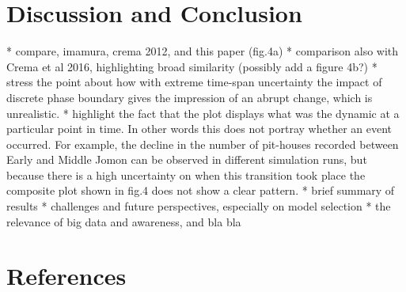 \documentclass[review]{elsarticle}
\begin{document}
\section{Discussion and Conclusion}
* compare, imamura, crema 2012, and this paper (fig.4a)
* comparison also with Crema et al 2016, highlighting broad similarity (possibly add a figure 4b?)
* stress the point about how with extreme time-span uncertainty the impact of discrete phase boundary gives the impression of an abrupt change, which is unrealistic.
* highlight the fact that the plot displays what was the dynamic at a particular point in time. In other words this does not portray whether an event occurred. For example, the decline in the number of pit-houses recorded between Early and Middle Jomon can be observed in different simulation runs, but because there is a high uncertainty on when this transition took place the composite plot shown in fig.4 does not show a clear pattern. 
* brief summary of results
* challenges and future perspectives, especially on model selection
* the relevance of big data and awareness, and bla bla

\section*{References}


\end{document}
